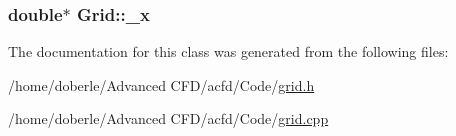 \subsubsection[{\texorpdfstring{\+\_\+x}{_x}}]{\setlength{\rightskip}{0pt plus 5cm}double$\ast$ Grid\+::\+\_\+x\hspace{0.3cm}{\ttfamily [private]}}\hypertarget{class_grid_ad1c8bee84202faab01651a41ff338368}{}\label{class_grid_ad1c8bee84202faab01651a41ff338368}


The documentation for this class was generated from the following files\+:\begin{DoxyCompactItemize}
\item 
/home/doberle/\+Advanced C\+F\+D/acfd/\+Code/\hyperlink{grid_8h}{grid.\+h}\item 
/home/doberle/\+Advanced C\+F\+D/acfd/\+Code/\hyperlink{grid_8cpp}{grid.\+cpp}\end{DoxyCompactItemize}
